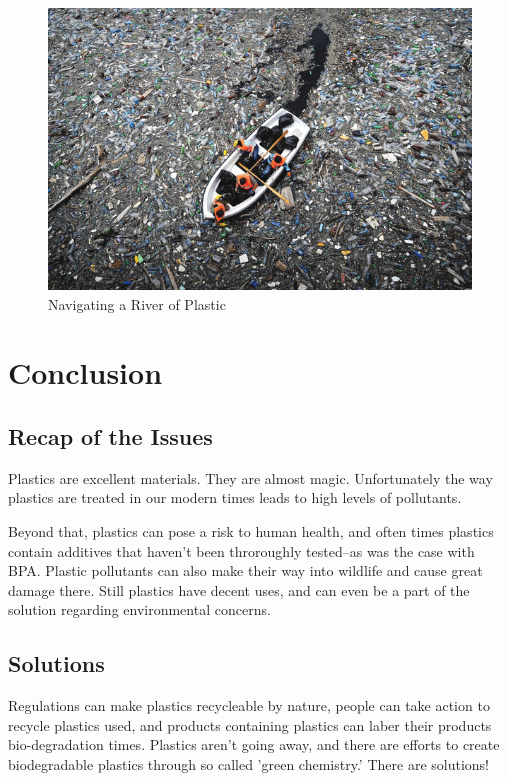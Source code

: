 \documentclass[paper=a4, fontsize=11pt]{article}
\begin{document}
\begin{figure}[ht!]
\includegraphics[scale=.5]{plastic_river.jpg}
\caption{Navigating a River of Plastic \cite{long_term}}
\end{figure}



\section{Conclusion}

\subsection{Recap of the Issues}

Plastics are excellent materials. They are almost magic. Unfortunately the way plastics are treated in our modern times leads to high
levels of pollutants. 

Beyond that, plastics can pose a risk to human health, and often times plastics contain additives that haven't been throroughly tested--as was the case 
with BPA. Plastic pollutants can also make their way into wildlife and cause great damage there. Still plastics have decent uses, and can even be a part
of the solution regarding environmental concerns.

\subsection{Solutions}
Regulations can make plastics recycleable by nature, people can take action to recycle plastics used, and products containing plastics can laber their products bio-degradation
times. Plastics aren't going away, and there are efforts to create biodegradable plastics through so called 'green chemistry.'
There are solutions! 



\end{document}
